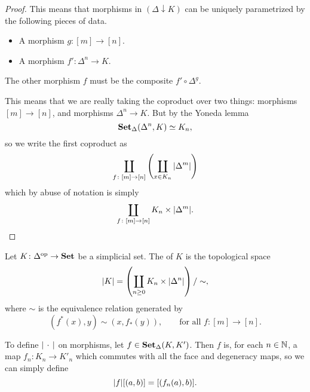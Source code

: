 \documentclass[main.tex]{subfiles}
\begin{document}
\begin{proof}
  This means that morphisms in $(\Delta \downarrow K)$ can be uniquely parametrized by the following pieces of data. 
  \begin{itemize}
    \item A morphism $g\colon [m] \to [n]$. 

    \item A morphism $f'\colon \Delta^{n} \to K$. 
  \end{itemize}
  The other morphism $f$ must be the composite $f' \circ \Delta^{g}$.

  This means that we are really taking the coproduct over two things: morphisms $[m] \to [n]$, and morphisms $\Delta^{n} \to K$. But by the Yoneda lemma
  \begin{equation*}
    \operatorname{\mathbf{Set}_{\Delta}}(\Delta^{n}, K) \simeq K_{n},
  \end{equation*}
  so we write the first coproduct as
  \begin{equation*}
    \coprod_{f\colon [m] \to [n]}\left( \coprod_{x \in K_{n}} {| \Delta^{m} |} \right)
  \end{equation*}
  which by abuse of notation is simply
  \begin{equation*}
    \coprod_{f\colon [m] \to [n]} K_{n} \times {| \Delta^{m} |}.
  \end{equation*}
\end{proof}

Let $K\colon \Delta^{\mathrm{op}} \to \mathbf{Set}$ be a simplicial set. The  of $K$ is the topological space
\begin{equation*}
  {| K |} = \left( \coprod_{n \geq 0} K_{n} \times {| \Delta^{n} |} \right) /\sim,
\end{equation*}
where $\sim$ is the equivalence relation generated by
\begin{equation*}
  (f^{*}(x), y) \sim (x, f_{*}(y)),\qquad \text{for all } f\colon[m] \to [n].
\end{equation*}

To define ${| \,\cdot\, |}$ on morphisms, let $f \in \operatorname{\mathbf{Set}_{\Delta}}(K, K')$. Then $f$ is, for each $n \in \mathbb{N}$, a map $f_{n}\colon K_{n} \to K'_{n}$ which commutes with all the face and degeneracy maps, so we can simply define
\begin{equation*}
  {| f |}[(a, b)] = [(f_{n}(a), b)].
\end{equation*}
\end{document}
